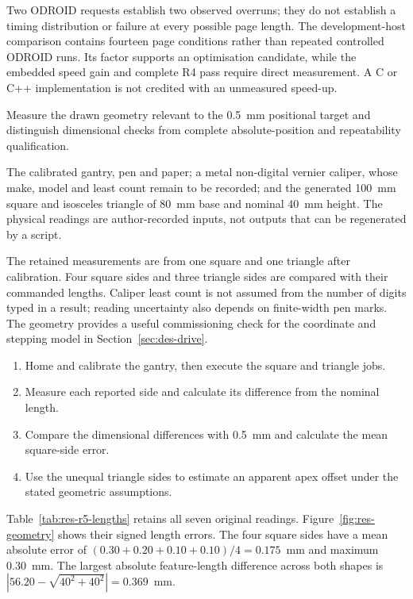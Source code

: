 Two ODROID requests establish two observed overruns; they do not establish a timing distribution or failure at every possible page length. The development-host comparison contains fourteen page conditions rather than repeated controlled ODROID runs. Its factor supports an optimisation candidate, while the embedded speed gain and complete R4 pass require direct measurement. A C or C++ implementation is not credited with an unmeasured speed-up.

Measure the drawn geometry relevant to the 0.5~mm positional target and distinguish dimensional checks from complete absolute-position and repeatability qualification.

The calibrated gantry, pen and paper; a metal non-digital vernier caliper, whose make, model and least count remain to be recorded; and the generated 100~mm square and isosceles triangle of 80~mm base and nominal 40~mm height. The physical readings are author-recorded inputs, not outputs that can be regenerated by a script.

The retained measurements are from one square and one triangle after calibration. Four square sides and three triangle sides are compared with their commanded lengths. Caliper least count is not assumed from the number of digits typed in a result; reading uncertainty also depends on finite-width pen marks. The geometry provides a useful commissioning check for the coordinate and stepping model in Section~\ref{sec:des-drive}.

\begin{enumerate}\setlength{\itemsep}{1pt}
\item Home and calibrate the gantry, then execute the square and triangle jobs.
\item Measure each reported side and calculate its difference from the nominal length.
\item Compare the dimensional differences with 0.5~mm and calculate the mean square-side error.
\item Use the unequal triangle sides to estimate an apparent apex offset under the stated geometric assumptions.
\end{enumerate}

Table~\ref{tab:res-r5-lengths} retains all seven original readings. Figure~\ref{fig:res-geometry} shows their signed length errors. The four square sides have a mean absolute error of $(0.30+0.20+0.10+0.10)/4=0.175$~mm and maximum 0.30~mm. The largest absolute feature-length difference across both shapes is $|56.20-\sqrt{40^2+40^2}|=0.369$~mm.



